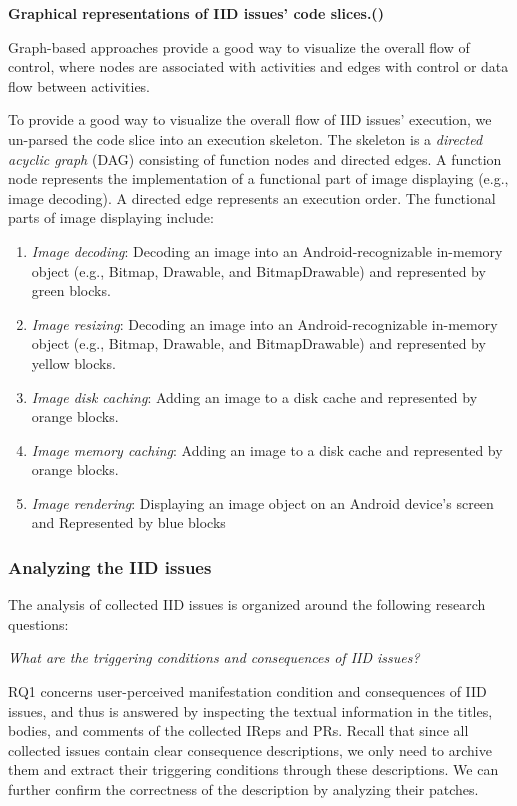 \medskip

\noindent\textbf{Graphical representations of IID issues’ code slices.()} 

Graph-based approaches provide a good way to visualize the overall flow of control, where nodes are associated with activities and edges with control or data flow between activities. 

To provide a good way to visualize the overall flow of IID issues' execution, we un-parsed the code slice into an execution skeleton. The skeleton is a \emph{directed acyclic graph} (DAG) consisting of function nodes and directed edges. A function node represents the implementation of a functional part of image displaying (e.g., image decoding). A directed edge represents an execution order. The functional parts of image displaying include:
\begin{enumerate}
	\item \emph{Image decoding}: Decoding an image into an Android-recognizable in-memory object (e.g., Bitmap, Drawable, and BitmapDrawable) and represented by green blocks.
	
	\item \emph{Image resizing}: Decoding an image into an Android-recognizable in-memory object (e.g., Bitmap, Drawable, and BitmapDrawable) and represented by yellow blocks.
	
	\item \emph{Image disk caching}: Adding an image to a disk cache and represented by orange blocks.
	
	\item \emph{Image memory caching}: Adding an image to a disk cache and represented by orange blocks.
	
	\item \emph{Image rendering}: Displaying an image object on an Android device’s screen    and Represented by blue blocks  
\end{enumerate}

\subsubsection{Analyzing the IID issues} \label{subsec:issue-analysis}

The analysis of collected IID issues is organized around the following research questions:

 \emph{What are the triggering conditions and consequences of IID issues?}

RQ1 concerns user-perceived manifestation condition and consequences of IID issues, 
and thus is answered by inspecting the textual information in the titles, bodies, and comments of the collected IReps and PRs.
Recall that since all collected issues contain clear consequence descriptions,
we only need to archive them and extract their triggering conditions through these descriptions. We can further confirm the correctness of the description by analyzing their patches.

